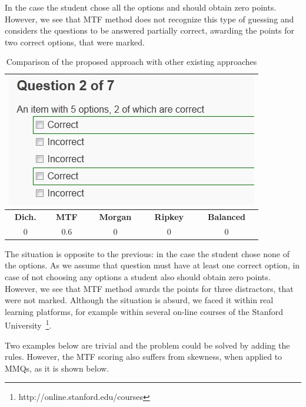 \begin{example}
In the case the student chose all the options and should obtain zero points. 
However, we see that MTF method does not recognize this type of guessing and considers the questions to be answered partially correct, awarding the points for two correct options, that were marked.
\end{example}

\begin{table}[h!]
	\centering
	\begin{tabularx}{0.5\columnwidth}{c c c c c} 
	\toprule  
    \multicolumn{5}{c}{\includegraphics[width=0.5\columnwidth]{images/case2.jpg}}\\
    \midrule
    \textbf{Dich.}&\textbf{MTF}&\textbf{Morgan}&\textbf{Ripkey}&\textbf{Balanced}\\
	\midrule
    0&0.6&0&0&0\\
	\bottomrule
    \end{tabularx}
	\caption{Comparison of the proposed approach with other existing approaches}
	\label{tab:case 2}
\end{table}

\begin{example}
The situation is opposite to the previous: in the case the student chose none of the options. 
As we assume that question must have at least one correct option, in  case of not choosing any options a student also should obtain zero points.
However, we see that MTF method awards the points for three distractors, that were not marked.
Although the situation is absurd, we faced it within real learning platforms, for example within several on-line courses of the Stanford University~\footnote{http://online.stanford.edu/courses}.
\end{example}

Two examples below are trivial and the problem could be solved by adding the rules. 
However, the MTF scoring also suffers from skewness, when applied to MMQs, as it is shown below.

